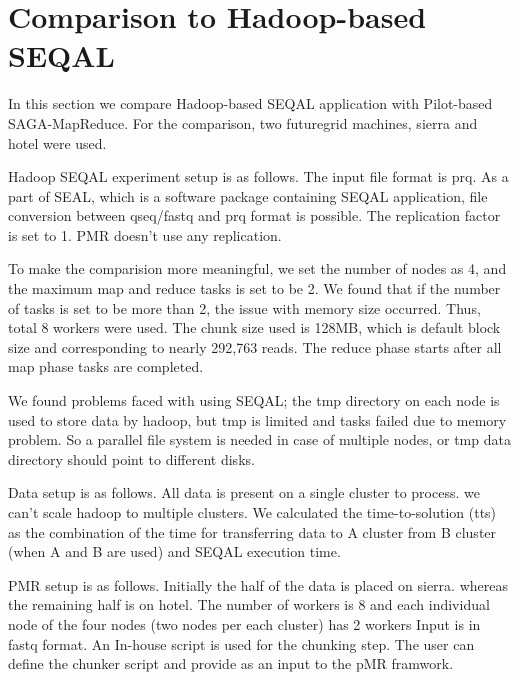 \documentclass{sig-alternate}
\begin{document}
\section{Comparison to Hadoop-based SEQAL}

In this section we compare Hadoop-based SEQAL application with Pilot-based SAGA-MapReduce. 
For the comparison, two futuregrid machines, sierra and hotel were used.

Hadoop SEQAL experiment setup is as follows.  The input file format is prq.  As a part of SEAL, which is a software package containing SEQAL application, file conversion between qseq/fastq and prq format is possible.  The replication factor is set  to 1.     PMR doesn't use any replication.

To make the comparision more meaningful, we set the number of nodes as 4, and the maximum map and reduce tasks is set to be 2.  We found that if the number of tasks is set to be more than 2, the issue with memory size occurred.    Thus, total 8 workers were used.
The chunk size used is 128MB, which is default block size and corresponding to nearly 292,763 reads.
The reduce phase starts after all map phase tasks are completed. 

We found problems faced with using SEQAL; the tmp directory on each node is used to store data  by hadoop, but tmp is limited and tasks failed due to memory problem.  So a parallel file system is needed in case of multiple nodes, or tmp data directory should point to different disks.

Data setup is as follows. All data is present on a single cluster to process. we can't scale hadoop to multiple clusters.
We calculated the time-to-solution (tts) as the combination of the time for transferring data to A cluster from B cluster (when A and B are used) and SEQAL execution time. 
 
PMR setup is as follows.  Initially the half of the data is placed on sierra. whereas the remaining half is on hotel. The number of workers is 8 and each individual node of the four nodes (two nodes per each cluster) has 2 workers
   Input is in fastq format. An In-house script is used for the chunking step. The user can define the chunker script and provide as an input to the pMR framwork.  
 
\end{document}
